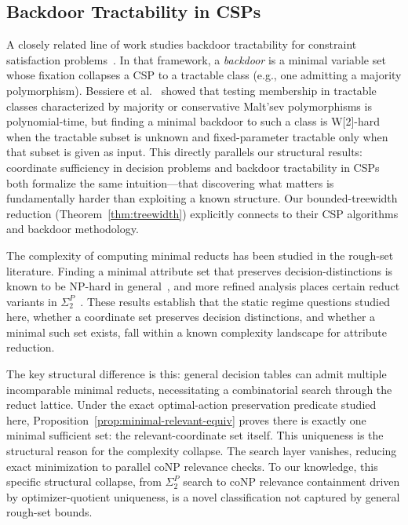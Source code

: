 \subsection{Backdoor Tractability in CSPs}
A closely related line of work studies backdoor tractability for constraint satisfaction problems~\cite{williams2003backdoors, bessiere2013detecting}. In that framework, a \emph{backdoor} is a minimal variable set whose fixation collapses a CSP to a tractable class (e.g., one admitting a majority polymorphism). Bessiere et al.~\cite{bessiere2013detecting} showed that testing membership in tractable classes characterized by majority or conservative Malt'sev polymorphisms is polynomial-time, but finding a minimal backdoor to such a class is W[2]-hard when the tractable subset is unknown and fixed-parameter tractable only when that subset is given as input. This directly parallels our structural results: coordinate sufficiency in decision problems and backdoor tractability in CSPs both formalize the same intuition---that discovering what matters is fundamentally harder than exploiting a known structure. Our bounded-treewidth reduction (Theorem~\ref{thm:treewidth}) explicitly connects to their CSP algorithms and backdoor methodology.

The complexity of computing minimal reducts has been studied in the rough-set literature. Finding a minimal attribute set that preserves decision-distinctions is known to be NP-hard in general~\cite{slowinski1995decision}, and more refined analysis places certain reduct variants in $\Sigma_2^P$~\cite{multiplier}. These results establish that the static regime questions studied here, whether a coordinate set preserves decision distinctions, and whether a minimal such set exists, fall within a known complexity landscape for attribute reduction.

The key structural difference is this: general decision tables can admit multiple incomparable minimal reducts, necessitating a combinatorial search through the reduct lattice. Under the exact optimal-action preservation predicate studied here, Proposition~\ref{prop:minimal-relevant-equiv} proves there is exactly one minimal sufficient set: the relevant-coordinate set itself. This uniqueness is the structural reason for the complexity collapse. The search layer vanishes, reducing exact minimization to parallel coNP relevance checks. To our knowledge, this specific structural collapse, from $\Sigma_2^P$ search to coNP relevance containment driven by optimizer-quotient uniqueness, is a novel classification not captured by general rough-set bounds.


